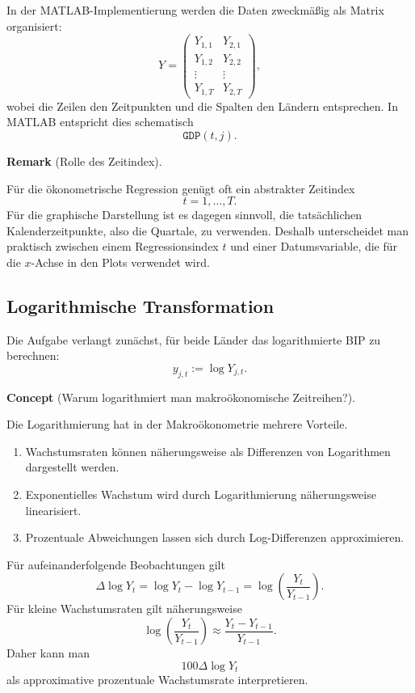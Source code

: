 \documentclass[10pt, letterpaper]{article}
\newcommand{\CustomHeading}[3]{%
  \par\medskip\noindent%
  \textbf{#1 #2} \textnormal{(#3)}.\enskip%
}
\newenvironment{REM}[2]{\CustomHeading{Remark}{#1}{#2}}{}
\newenvironment{CONC}[2]{\CustomHeading{Concept}{#1}{#2}}{}
\begin{document}
In der MATLAB-Implementierung werden die Daten zweckmäßig als Matrix organisiert:
\[
Y
=
\begin{pmatrix}
Y_{1,1} & Y_{2,1}\\
Y_{1,2} & Y_{2,2}\\
\vdots & \vdots\\
Y_{1,T} & Y_{2,T}
\end{pmatrix},
\]
wobei die Zeilen den Zeitpunkten und die Spalten den Ländern entsprechen. In MATLAB entspricht dies schematisch
\[
\texttt{GDP}(t,j).
\]

\begin{REM}{}{Rolle des Zeitindex}
Für die ökonometrische Regression genügt oft ein abstrakter Zeitindex
\[
t=1,\dots,T.
\]
Für die graphische Darstellung ist es dagegen sinnvoll, die tatsächlichen Kalenderzeitpunkte, also die Quartale, zu verwenden. Deshalb unterscheidet man praktisch zwischen einem Regressionsindex \(t\) und einer Datumsvariable, die für die \(x\)-Achse in den Plots verwendet wird.
\end{REM}

\subsection{Logarithmische Transformation}

Die Aufgabe verlangt zunächst, für beide Länder das logarithmierte BIP zu berechnen:
\[
y_{j,t}:=\log Y_{j,t}.
\]

\begin{CONC}{}{Warum logarithmiert man makroökonomische Zeitreihen?}
Die Logarithmierung hat in der Makroökonometrie mehrere Vorteile.
\begin{enumerate}
    \item Wachstumsraten können näherungsweise als Differenzen von Logarithmen dargestellt werden.
    \item Exponentielles Wachstum wird durch Logarithmierung näherungsweise linearisiert.
    \item Prozentuale Abweichungen lassen sich durch Log-Differenzen approximieren.
\end{enumerate}
\end{CONC}

Für aufeinanderfolgende Beobachtungen gilt
\[
\Delta \log Y_t
=
\log Y_t-\log Y_{t-1}
=
\log\left(\frac{Y_t}{Y_{t-1}}\right).
\]
Für kleine Wachstumsraten gilt näherungsweise
\[
\log\left(\frac{Y_t}{Y_{t-1}}\right)
\approx
\frac{Y_t-Y_{t-1}}{Y_{t-1}}.
\]
Daher kann man
\[
100\Delta \log Y_t
\]
als approximative prozentuale Wachstumsrate interpretieren.
\end{document}
